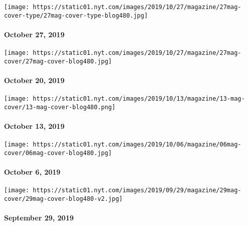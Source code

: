 \texttt{[image: https://static01.nyt.com/images/2019/10/27/magazine/27mag-cover-type/27mag-cover-type-blog480.jpg]}

\hypertarget{october-27-2019}{%
\paragraph{October 27, 2019}\label{october-27-2019}}

\href{https://www.nytimes.com/issue/magazine/2019/10/18/the-102019-issue}{}

\texttt{[image: https://static01.nyt.com/images/2019/10/27/magazine/27mag-cover/27mag-cover-blog480.jpg]}

\hypertarget{october-20-2019}{%
\paragraph{October 20, 2019}\label{october-20-2019}}

\href{https://www.nytimes.com/issue/magazine/2019/10/11/the-101319-issue}{}

\texttt{[image: https://static01.nyt.com/images/2019/10/13/magazine/13-mag-cover/13-mag-cover-blog480.png]}

\hypertarget{october-13-2019}{%
\paragraph{October 13, 2019}\label{october-13-2019}}

\href{https://www.nytimes.com/issue/magazine/2019/10/04/the-10619-issue}{}

\texttt{[image: https://static01.nyt.com/images/2019/10/06/magazine/06mag-cover/06mag-cover-blog480.jpg]}

\hypertarget{october-6-2019}{%
\paragraph{October 6, 2019}\label{october-6-2019}}

\href{https://www.nytimes.com/interactive/2019/09/24/magazine/adventure-archive-photos.html}{}

\texttt{[image: https://static01.nyt.com/images/2019/09/29/magazine/29mag-cover/29mag-cover-blog480-v2.jpg]}

\hypertarget{september-29-2019}{%
\paragraph{September 29, 2019}\label{september-29-2019}}

